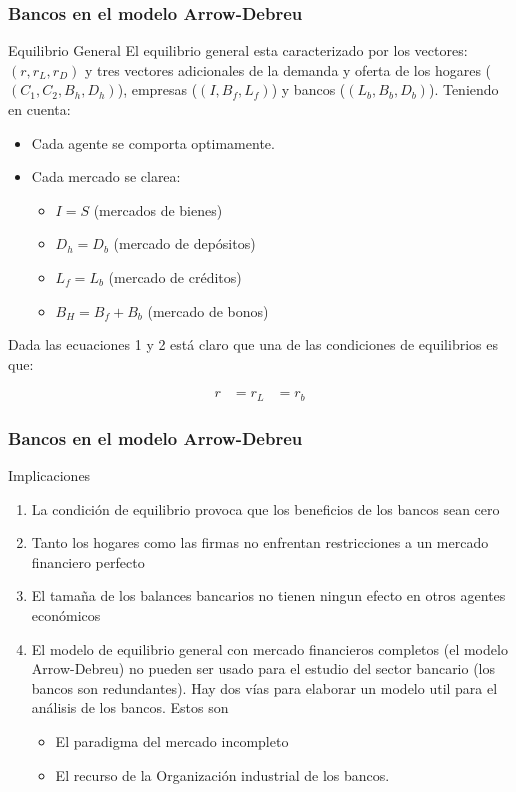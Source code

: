 \documentclass[10pt, xcolor=table, x11names]{beamer}
\begin{document}
\begin{frame}
    \frametitle{{\normalsize Bancos en el modelo Arrow-Debreu} {}}
    \begin{block} {Equilibrio General}
    El equilibrio general esta caracterizado por los vectores: $ (r, r_{L}, r_{D}) $ y tres vectores adicionales de la demanda y oferta de los hogares ($(C_{1}, C_{2}, B_{h}, D_{h}) $), empresas ($(I, B_{f}, L_{f}) $) y bancos ($(L_{b}, B_{b}, D_{b}) $).
    Teniendo en cuenta:
    \begin{itemize}
        \item Cada agente se comporta optimamente.
        \item Cada mercado se clarea:
        \begin{itemize}
            \item $I=S$ (mercados de bienes)
            \item $D_{h}=D_{b} $ (mercado de depósitos)
            \item $L_{f}=L_{b} $ (mercado de créditos)
            \item $B_{H}=B_{f}+B_{b}$ (mercado de bonos)
        \end{itemize}
    \end{itemize}
   Dada las ecuaciones 1 y 2 está claro que una de las condiciones de equilibrios es que:
   
   \begin{align}
   r&=r_{L}&=r_{b}
   \end{align} 
    \end{block}	
\end{frame}



\begin{frame}
    \frametitle{{\normalsize Bancos en el modelo Arrow-Debreu} {}}
    \begin{block} {Implicaciones}
        \begin{enumerate}
            \item La condición de equilibrio provoca que los beneficios de los bancos sean cero 
            \item Tanto los hogares como las firmas no enfrentan restricciones a un mercado financiero perfecto
           \item El tamaña de los balances bancarios no tienen ningun efecto en otros agentes económicos
           \item El modelo de equilibrio general con mercado financieros completos (el modelo Arrow-Debreu) no pueden ser usado para el estudio del sector bancario (los bancos son redundantes). Hay dos vías para elaborar un modelo util para el análisis de los bancos. Estos son
           \begin{itemize}
               \item El paradigma del mercado incompleto
               \item El recurso de la Organización industrial de los bancos.
           \end{itemize}
        \end{enumerate}
     
    \end{block}	
\end{frame}
\end{document}
